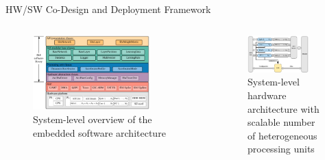 \begin{frame}{HW/SW Co-Design and Deployment Framework}
	\begin{columns}[t] %
		
		\begin{column}{0.5\textwidth}
			\begin{figure}
				\includegraphics[width=0.8\textwidth]{../chapters/sbs_accelerator/figures/sbs_software_component.pdf}
				\caption{System-level overview of the embedded software architecture}
			\end{figure}
		\end{column}
		
		\begin{column}{0.5\textwidth}
			\begin{figure}
				\includegraphics[width=0.8\textwidth]{../chapters/sbs_accelerator/figures/sbs_hw.pdf} %
				\caption{System-level hardware architecture with scalable number of heterogeneous processing units}
			\end{figure}
		\end{column}
		
	\end{columns}
\end{frame}

